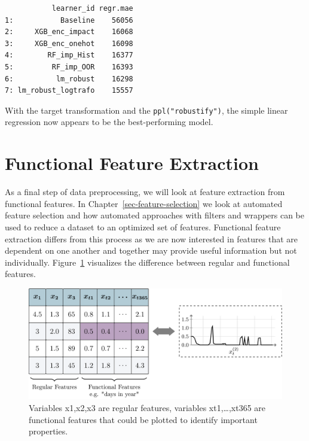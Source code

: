 \begin{verbatim}
           learner_id regr.mae
1:           Baseline    56056
2:     XGB_enc_impact    16068
3:     XGB_enc_onehot    16098
4:        RF_imp_Hist    16377
5:         RF_imp_OOR    16393
6:          lm_robust    16298
7: lm_robust_logtrafo    15557
\end{verbatim}

With the target transformation and the \texttt{ppl("robustify")}, the
simple linear regression now appears to be the best-performing model.

\hypertarget{functional-feature-extraction}{%
\section{Functional Feature
Extraction}\label{functional-feature-extraction}}

As a final step of data preprocessing, we will look at feature
extraction from functional features. In
Chapter~\ref{sec-feature-selection} we look at automated feature
selection and how automated approaches with
filters and wrappers can be used to reduce a dataset to an optimized set
of features. Functional feature extraction differs from this process as
we are now interested in features that are dependent on one another and
together may provide useful information but not individually.
Figure~\ref{fig-functional-features} visualizes the difference between
regular and functional features.

\begin{figure}

{\centering \includegraphics[width=1\textwidth,height=\textheight]{chapters/chapter9/Figures/mlr3book_figures-14.png}

}

\caption{\label{fig-functional-features}Variables x1,x2,x3 are regular
features, variables xt1,\ldots,xt365 are functional features that could
be plotted to identify important properties.}

\end{figure}

